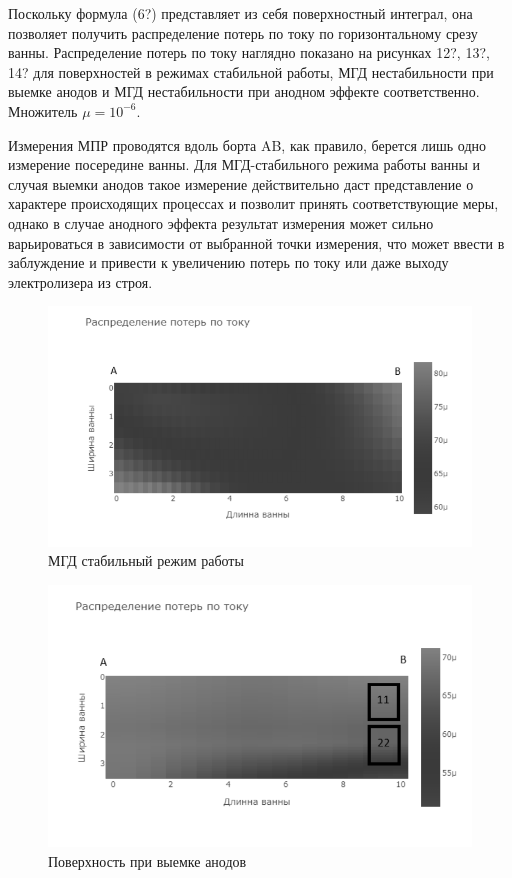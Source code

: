 \documentclass{article}
\begin{document}
Поскольку формула (6?) представляет из себя поверхностный интеграл, она позволяет получить распределение потерь по току по горизонтальному срезу ванны. Распределение потерь по току наглядно показано на рисунках 12?, 13?, 14? для поверхностей в режимах стабильной работы, МГД нестабильности при выемке анодов и МГД нестабильности при анодном эффекте соответственно. Множитель $\mu = 10^{-6}$.

Измерения МПР проводятся вдоль борта AB, как правило, берется лишь одно измерение посередине ванны. Для МГД-стабильного режима работы ванны и случая выемки анодов такое измерение действительно даст представление о характере происходящих процессах и позволит принять соответствующие меры, однако в случае анодного эффекта результат измерения может сильно варьироваться в зависимости от выбранной точки измерения, что может ввести в заблуждение и привести к увеличению потерь по току или даже выходу электролизера из строя.

\begin{figure}[H]
\hspace*{-5cm}\includegraphics[width=200mm]{h.PNG}
\caption{МГД стабильный режим работы}
\end{figure}

\begin{figure}[H]
\hspace*{-5cm}\includegraphics[width=200mm]{выемка анодов.PNG}
\caption{Поверхность при выемке анодов}
\end{figure}
\end{document}

